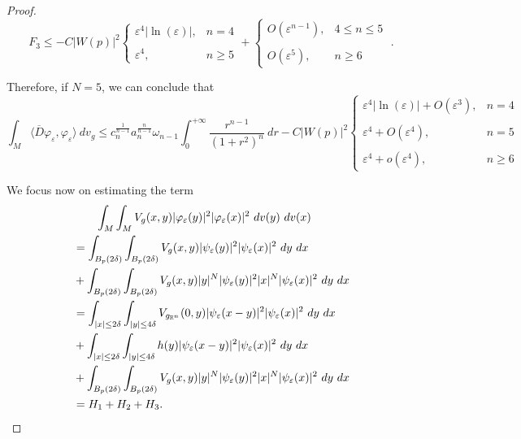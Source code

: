 \documentclass[11pt]{article}
\newtheorem{lemma}{Lemma}[section]
\def \R {\mathbb{R}}
\begin{document}
{\begin{proof}
$$F_{3}\leq -C|W(p)|^{2}\left\{ \begin{array}{ll}
\varepsilon^{4}|\ln(\varepsilon)|, & n=4\\
\\
\varepsilon^{4}, & n\geq 5
\end{array}
\right.   + 
\left\{ \begin{array}{ll}
O(\varepsilon^{n-1}), & 4\leq n \leq 5\\
\\
O(\varepsilon^{5}), & n\geq 6
\end{array}
\right. \; .$$

\noindent
Therefore, if $N=5$, we can conclude that
\begin{equation}\label{dep}
\int_{M}\langle \overline{D} \varphi_{\varepsilon},\varphi_{\varepsilon}\rangle \ dv_{g}\leq c_{n}^{\frac{1}{n-1}}a_{n}^{\frac{n}{n-1}}\omega_{n-1}\int_{0}^{+\infty}\frac{r^{n-1}}{(1+r^{2})^{n}}\ dr -C |W(p)|^{2}\left\{\begin{array}{ll}\varepsilon^{4}|\ln(\varepsilon)| +O(\varepsilon^{3}), & n=4\\
\\
\varepsilon^{4}+O(\varepsilon^{4}), & n= 5\\
\\
\varepsilon^{4}+o(\varepsilon^{4}), & n\geq 6
\end{array}
\right.
\end{equation}

\noindent
We focus now on estimating the term
\begin{align}
& \qquad \int_{M}\int_{M}V_{g}(x,y)|\varphi_{\varepsilon}(y)|^{2}|\varphi_{\varepsilon}(x)|^{2}\ dv(y)\ dv(x) \notag\\
& = \int_{B_{p}(2\delta)}\int_{B_{p}(2\delta)}V_{g}(x,y)|\psi_{\varepsilon}(y)|^{2}|\psi_{\varepsilon}(x)|^{2}\ dy\ dx \notag\\
& +\int_{B_{p}(2\delta)}\int_{B_{p}(2\delta)}V_{g}(x,y)|y|^{N}|\psi_{\varepsilon}(y)|^{2}|x|^{N}|\psi_{\varepsilon}(x)|^{2}\ dy\ dx\notag\\
&=\int_{|x|\leq 2\delta}\int_{|y|\leq 4\delta}V_{g_{\R^{n}}}(0,y)|\psi_{\varepsilon}(x-y)|^{2}|\psi_{\varepsilon}(x)|^{2}\ dy \ dx \notag \\
&+\int_{|x|\leq 2\delta}\int_{|y|\leq 4\delta}h(y)|\psi_{\varepsilon}(x-y)|^{2}|\psi_{\varepsilon}(x)|^{2}\ dy \ dx\notag\\
&+\int_{B_{p}(2\delta)}\int_{B_{p}(2\delta)}V_{g}(x,y)|y|^{N}|\psi_{\varepsilon}(y)|^{2}|x|^{N}|\psi_{\varepsilon}(x)|^{2}\ dy \ dx\notag\\
&=H_{1}+H_{2}+H_{3}.\notag\\
\end{align}



\end{proof}}
\end{document}
